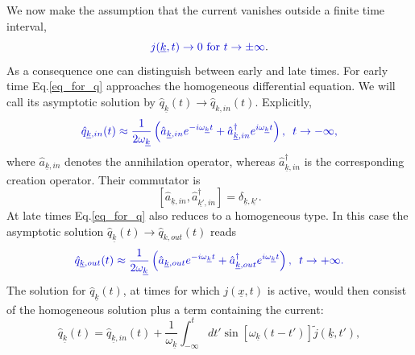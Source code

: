 \documentclass[12pt, titlepage]{article}
\begin{document}
We now make the assumption that the current vanishes outside a finite time interval,
\begin{equation}
\textcolor[RGB]{0,0,204}{
j(\underline{k},t)\rightarrow 0 \text{ for } t\rightarrow \pm \infty
}.
\end{equation}
As a consequence one can distinguish between early and late times. For early time  Eq.\enskip\eqref{eq_for_q} approaches the homogeneous differential equation. We will call its asymptotic solution by $ \hat{q}_{\underline{k}}(t) \rightarrow \hat{q}_{k,in}(t) $. Explicitly, 
\begin{equation}\label{q_In_operators}
 \textcolor[RGB]{0,0,204}{
 \hat{q}_{\underline{k},in}(t) 
  \approx
  \dfrac{1}{2\omega_{\underline{k}}}\left(
	\hat{a}_{\underline{k},in} 
	e^{-i\omega_{\underline{k}}t}
	+
	\hat{a}^{\dagger}_{\underline{k},in}  
	e^{i\omega_{\underline{k}}t}
  \right) 
  ,
   \enskip t\rightarrow -\infty,}
\end{equation}
where $ \hat{a}_{\underline{k},in} $ denotes the annihilation operator, whereas $ \hat{a}^{\dagger}_{\underline{k},in} $ is the corresponding creation operator. Their commutator is
\begin{equation}\label{crea_anni_commutator}
\left[ 
\hat{a}_{\underline{k},in}
,
\hat{a}^{\dagger}_{\underline{k'},in}
\right] 
=\delta_{\underline{k},\underline{k'}}
.
\end{equation}
At late times Eq.\enskip\eqref{eq_for_q} also reduces to a homogeneous type. In this case the asymptotic solution $ \hat{q}_{\underline{k}}(t) \rightarrow \hat{q}_{k,out}(t) $ reads
\begin{equation}\label{q_Out_operators}
 \textcolor[RGB]{0,0,204}{
 \hat{q}_{\underline{k},out}(t) 
  \approx
  \dfrac{1}{2\omega_{\underline{k}}}\left(
	\hat{a}_{\underline{k},out} 
	e^{-i\omega_{\underline{k}}t}
	+
	\hat{a}^{\dagger}_{\underline{k},out}  
	e^{i\omega_{\underline{k}}t}
  \right) 
  ,
  \enskip t\rightarrow +\infty.}
\end{equation}
The solution for $ \hat{q}_{\underline{k}}(t) $, at times for which $ j(\underline{x},t) $ is active, would then consist of the homogeneous solution plus a term containing the current:
\begin{equation}\label{q_full}
 \hat{q}_{\underline{k}}(t) 
  =
  \hat{q}_{\underline{k},in}(t) 
  +
    \dfrac{1}{\omega_{\underline{k}}}
    \int^{t}_{-\infty}
    dt'
    \sin\left[\omega_{\underline{k}}(t-t') \right] \tilde{j}(\underline{k},t')
    ,
\end{equation}
\end{document}
